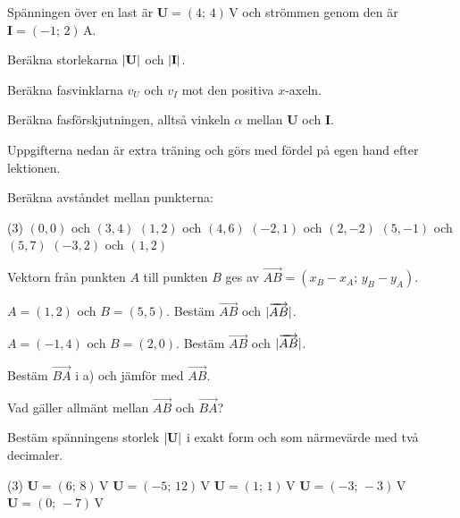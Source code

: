 Spänningen över en last är $\mathbf{U} = (4;\, 4)\,\text{V}$ och strömmen genom den är $\mathbf{I}
= (-1;\, 2)\,\text{A}$.
\begin{parts}
  \item Beräkna storlekarna $\lvert\mathbf{U}\rvert$ och $\lvert\mathbf{I}\rvert$.
  \item Beräkna fasvinklarna $v_U$ och $v_I$ mot den positiva $x$-axeln.
  \item Beräkna fasförskjutningen, alltså vinkeln $\alpha$ mellan $\mathbf{U}$ och $\mathbf{I}$.
\end{parts}

Uppgifterna nedan är extra träning och görs med fördel på egen hand efter lektionen.

Beräkna avståndet mellan punkterna:
\begin{delar}(3)
  \task $(0, 0)$ och $(3, 4)$
  \task $(1, 2)$ och $(4, 6)$
  \task $(-2, 1)$ och $(2, -2)$
  \task $(5, -1)$ och $(5, 7)$
  \task $(-3, 2)$ och $(1, 2)$
\end{delar}

Vektorn från punkten $A$ till punkten $B$ ges av $\overrightarrow{AB} = (x_B - x_A;\, y_B - y_A)$.
\begin{parts}
  \item $A = (1, 2)$ och $B = (5, 5)$. Bestäm $\overrightarrow{AB}$ och $\lvert\overrightarrow{AB}\rvert$.
  \item $A = (-1, 4)$ och $B = (2, 0)$. Bestäm $\overrightarrow{AB}$ och $\lvert\overrightarrow{AB}\rvert$.
  \item Bestäm $\overrightarrow{BA}$ i a) och jämför med $\overrightarrow{AB}$.
  \item Vad gäller allmänt mellan $\overrightarrow{AB}$ och $\overrightarrow{BA}$?
\end{parts}

Bestäm spänningens storlek $\lvert\mathbf{U}\rvert$ i exakt form och som närmevärde med två decimaler.
\begin{delar}(3)
  \task $\mathbf{U} = (6;\, 8)\,\text{V}$
  \task $\mathbf{U} = (-5;\, 12)\,\text{V}$
  \task $\mathbf{U} = (1;\, 1)\,\text{V}$
  \task $\mathbf{U} = (-3;\, -3)\,\text{V}$
  \task $\mathbf{U} = (0;\, -7)\,\text{V}$
\end{delar}

